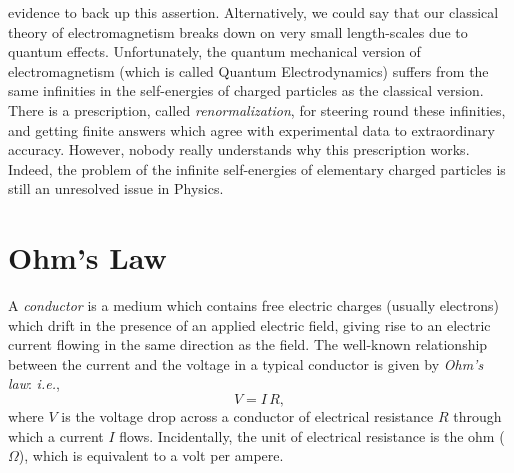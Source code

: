evidence to back up this assertion.
Alternatively, we could say that our classical
theory of electromagnetism breaks down on very small length-scales due to
quantum effects. Unfortunately, the quantum mechanical version of electromagnetism
(which is called Quantum Electrodynamics) 
suffers from the same infinities in the self-energies of charged particles as the classical
version. There is a prescription, called {\em renormalization}, for steering round these 
infinities, and getting finite answers which agree with experimental data to
extraordinary accuracy. However, nobody really understands why this prescription
works. Indeed, the problem of the
infinite self-energies of elementary charged particles is still an unresolved
issue in Physics. 

\section{Ohm's Law}\label{s4.2}
A {\em conductor}\/ is a medium which contains free electric charges (usually electrons) which drift in the presence of an applied electric field, giving rise to an
electric current flowing in the same direction as the field. The well-known
relationship between the current and the voltage in a typical conductor is given by
 {\em Ohm's law}: {\em i.e.}, 
\begin{equation}
V = I\, R,
\end{equation}
where $V$ is the voltage drop across a conductor of electrical resistance $R$ through which a current $I$
flows. Incidentally, the unit of electrical resistance is the
ohm ($\Omega$), which is equivalent to a volt per ampere.

